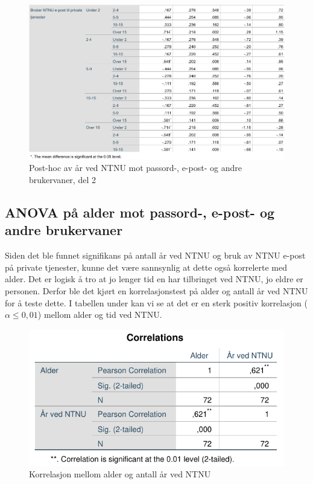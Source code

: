 \begin{figure}[H]
    \centering
    \includegraphics[scale=0.7]{case_2/bilder/spss/anova_ttest/ansiennitet_diverse_posthoc_2.pdf}
    \caption[ansiennitet-diverse-posthoc-2]{Post-hoc av år ved NTNU mot passord-, e-post- og andre brukervaner, del 2}
    \label{fig:alder-bevissthetogkjennskap-descriptive-2}
\end{figure}

\subsection{ANOVA på alder mot passord-, e-post- og andre brukervaner}
Siden det ble funnet signifikans på antall år ved NTNU og bruk av NTNU e-post på private tjenester, kunne det være sannsynlig at dette også korrelerte med alder. Det er logisk å tro at jo lenger tid en har tilbringet ved NTNU, jo eldre er personen. Derfor ble det kjørt en korrelasjonstest på alder og antall år ved NTNU for å teste dette. I tabellen under kan vi se at det er en sterk positiv korrelasjon (\(\alpha \le 0,01\)) mellom alder og tid ved NTNU.

\begin{figure}[H]
    \centering
    \includegraphics[scale=1]{case_2/bilder/spss/anova_ttest/alder_aarvedNTNU_korrelasjon.pdf}
    \caption[alder-aarvedNTNU-korrelasjon]{Korrelasjon mellom alder og antall år ved NTNU}
    \label{fig:alder-aarvedNTNU-korrelasjon}
\end{figure}

